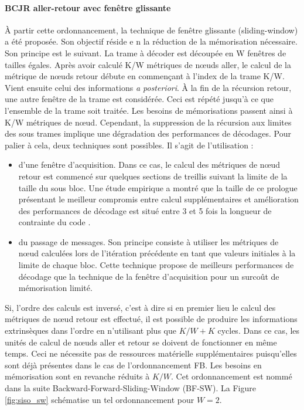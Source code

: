 \paragraph*{BCJR aller-retour avec fenêtre glissante}
À partir cette ordonnancement, la technique de fenêtre glissante (sliding-window) a été proposée. Son objectif réside e
n la réduction de la mémorisation nécessaire. Son principe est le suivant. La trame à décoder est découpée en W fenêtres 
de tailles égales. Après avoir calculé K/W métriques de nœuds aller, le calcul de la métrique de nœuds retour débute 
en commençant à l'index de la trame K/W. Vient ensuite celui des informations \textit{a posteriori}. À la fin de la 
récursion retour, une autre fenêtre de la trame est considérée. Ceci est répété jusqu'à ce que l'ensemble de la trame
soit traitée. Les besoins de mémorisations passent ainsi à K/W métriques de nœud. Cependant, la suppression de la 
récursion aux limites des sous trames implique une dégradation  des performances de décodages. Pour palier à cela, deux 
techniques sont possibles. Il s'agit de l'utilisation : 
\begin{itemize}
	\item d'une fenêtre d'acquisition. Dans ce cas, le calcul des métriques de nœud retour est commencé sur 
	quelques sections de treillis suivant la limite de la taille du sous bloc. Une étude empirique a montré que la 
	taille de ce prologue présentant le meilleur compromis entre calcul supplémentaires et amélioration des performances de décodage est situé entre 3 et 5 fois la longueur de contrainte du code \cite{sw_init}.
	\item du passage de messages. Son principe consiste à utiliser les métriques de nœud calculées lors de l'itération précédente en tant que valeurs initiales à la limite de chaque bloc. Cette technique propose de meilleurs performances de décodage que la technique de la fenêtre d'acquisition pour un surcoût de mémorisation limité.
\end{itemize}
Si, l'ordre des calculs est inversé, c'est à dire si en premier lieu le calcul des métriques de nœud retour est 
effectué, il est possible de produire les informations extrinsèques dans l'ordre en n'utilisant plus que $K/W + K$
cycles. Dans ce cas, les unités de calcul de nœuds aller et retour se doivent de fonctionner en même temps. Ceci ne 
nécessite pas de ressources matérielle supplémentaires puisqu'elles sont déjà présentes dans le cas de l'ordonnancement 
FB. Les besoins en mémorisation sont en revanche réduits à $K/W$. Cet ordonnancement est nommé dans la suite 
Backward-Forward-Sliding-Window (BF-SW). La Figure \ref{fig:siso_sw} schématise un tel ordonnancement pour $W=2$.

